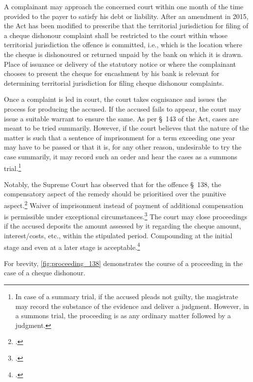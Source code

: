 \documentclass[12pt,a4paper]{article}
\begin{document}
\begin{appendices}
 A complainant may approach the concerned court within one month of the time provided to the payer to satisfy his debt or liability. After an amendment in 2015, the Act has been modified to prescribe that the territorial jurisdiction for filing of a cheque dishonour complaint shall be restricted to the court within whose territorial jurisdiction the offence is committed, i.e., which is the location where the cheque is dishonoured or returned unpaid by the bank on which it is drawn. Place of issuance or delivery of the statutory notice or where the complainant chooses to present the cheque for encashment by his bank is relevant for determining territorial jurisdiction for filing cheque dishonour complaints.
 
 Once a complaint is led in court, the court takes cognisance and issues the process for producing the accused. If the accused fails to appear, the court may issue a suitable warrant to ensure the same. As per \S~143 of the Act, cases are meant to be tried summarily. However, if the court believes that the nature of the matter is such that a sentence of imprisonment for a term exceeding one year may have to be passed or that it is, for any other reason, undesirable to try the case summarily, it may record such an order and hear the cases as a summons trial.\footnote{In case of a summary trial, if the accused pleads not guilty, the magistrate may record the substance of the evidence and deliver a judgment. However, in a summons trial, the proceeding is as any ordinary matter followed by a judgment.}
 
 Notably, the Supreme Court has observed that for the offence \S~138, the compensatory aspect of the remedy should be prioritised over the punitive aspect.\footcite{sc2010_damodar} Waiver of imprisonment instead of payment of additional compensation is permissible under exceptional circumstances.\footcite{sc2018_priyanka} The court may close proceedings if the accused deposits the amount assessed by it regarding the cheque amount, interest/costs, etc., within the stipulated period. Compounding at the initial stage and even at a later stage is acceptable.\footcite{sc2018_meters} 
 
 For brevity, \cref{fig:proceeding_138} demonstrates the course of a proceeding in the case of a cheque dishonour.
 

\end{appendices}
\end{document}
